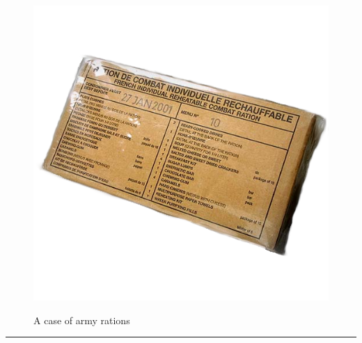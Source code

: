 \documentclass{article}
\begin{document}
    \begin{figure}[H]
        \centering
        \begin{minipage}{0.25\textwidth}
            \centering
            \includegraphics[width=\textwidth]{../SurvivalItemImages/rations}
        \end{minipage}\hfill
        \begin{minipage}{0.7\textwidth}
            \centering
            \Large A case of army rations
        \end{minipage}
    \end{figure}
    \vspace{-0.8em}
    \noindent\rule{\textwidth}{0.4pt}
            
    \clearpage
\end{document}

